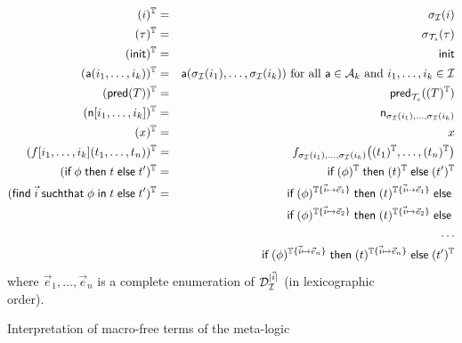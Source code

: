 \begin{figure}[t]
  \begin{eqnarray*}
    (i)^{\mathbb{T}} &=& \sigma_{\mathcal{I}}(i)
    \\
    (\tau)^{\mathbb{T}} &=& \sigma_{\mathcal{T}_s}(\tau) \\
    (\mathsf{init})^{\mathbb{T}} &=& \mathsf{init} \\
    (\textsf{a}(i_1,\ldots,i_k))^{\mathbb{T}} &=&
      \textsf{a}(\sigma_{\mathcal{I}}(i_1),\ldots,\sigma_{\mathcal{I}}(i_k))
      \text{ for all }
      \textsf{a}\in\mathcal{A}_k \text{ and } i_1,\ldots,i_k\in \mathcal{I} \\
    (\textsf{pred}(T))^{\mathbb{T}} &=&
      \mathsf{pred}_{\mathcal{T}_s}((T)^{\mathbb{T}})
    \\
    (\mathsf{n}[i_1,\ldots,i_k])^{\mathbb{T}} &=& \mathsf{n}_{\sigma_{\mathcal{I}}(i_1),\ldots,\sigma_{\mathcal{I}}(i_k)}
    \\
    (x)^{\mathbb{T}} &=& x
    \\
    (f[i_1,\ldots,i_k](t_1,\ldots,t_n))^{\mathbb{T}} &=&
    f_{\sigma_{\mathcal{I}}(i_1),\ldots,\sigma_{\mathcal{I}}(i_k)}\bigl(
      (t_1)^{\mathbb{T}},\ldots,(t_n)^{\mathbb{T}}
    \bigr)
    \\
    (\textsf{if}\; \phi \;\textsf{then}\; t \;\textsf{else}\; t')^{\mathbb{T}} &=&
    \textsf{if}\; (\phi)^{\mathbb{T}} \;\textsf{then}\; (t)^{\mathbb{T}} \;\textsf{else}\; (t')^{\mathbb{T}}
    \\
    (\textsf{find}\; \vec{i} \;\textsf{suchthat}\; \phi \;\textsf{in}\; t \;\textsf{else}\; t')^{\mathbb{T}} &=&
    \textsf{if}\; (\phi)^{\mathbb{T}\{\vec{i}\mapsto\vec{e}_1\}}
    \;\textsf{then}\; (t)^{\mathbb{T}\{\vec{i}\mapsto\vec{e}_1\}}
    \;\textsf{else}\; \\ & &
    \textsf{if}\; (\phi)^{\mathbb{T}\{\vec{i}\mapsto\vec{e}_2\}}
    \;\textsf{then}\; (t)^{\mathbb{T}\{\vec{i}\mapsto\vec{e}_2\}}
    \;\textsf{else}\; \\ & & \ldots \\ & &
    \textsf{if}\; (\phi)^{\mathbb{T}\{\vec{i}\mapsto\vec{e}_{n}\}}
    \;\textsf{then}\; (t)^{\mathbb{T}\{\vec{i}\mapsto\vec{e}_{n}\}}
    \;\textsf{else}\; (t')^{\mathbb{T}}
  \end{eqnarray*}
  where $\vec{e}_1, \ldots, \vec{e}_{n}$ is a complete enumeration
  of $\mathcal{D}_{\mathcal{I}}^{|\vec{i}|}$ (in lexicographic order).
  \caption{Interpretation of macro-free terms of the meta-logic}
  \label{fig:interpt}
\end{figure}

